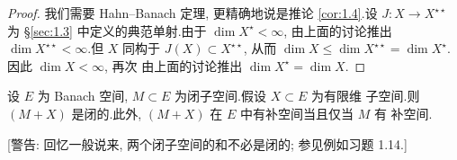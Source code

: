 \begin{proof}
我们需要 Hahn--Banach 定理, 更精确地说是推论  \ref{cor:1.4}.设
$J:X\to X^{\star\star}$ 为 \S \ref{sec:1.3} 中定义的典范单射.由于
$\dim X^\star<\infty$, 由上面的讨论推出 $\dim X^{\star\star}<\infty$.但
$X$ 同构于 $J(X)\subset X^{\star\star}$, 从而
$\dim X\le\dim X^{\star\star}=\dim X^\star$.因此 $\dim X<\infty$, 再次
由上面的讨论推出 $\dim X^\star=\dim X$.
\end{proof}

\begin{proposition}
\label{prop:11.4}
设 $E$ 为 Banach 空间, $M\subset E$ 为闭子空间.假设 $X\subset E$ 为有限维
子空间.则 $(M+X)$ 是闭的.此外, $(M+X)$ 在 $E$ 中有补空间当且仅当 $M$ 有
补空间.
\end{proposition}

[警告: 回忆一般说来, 两个闭子空间的和不必是闭的; 参见例如习题 1.14.]

